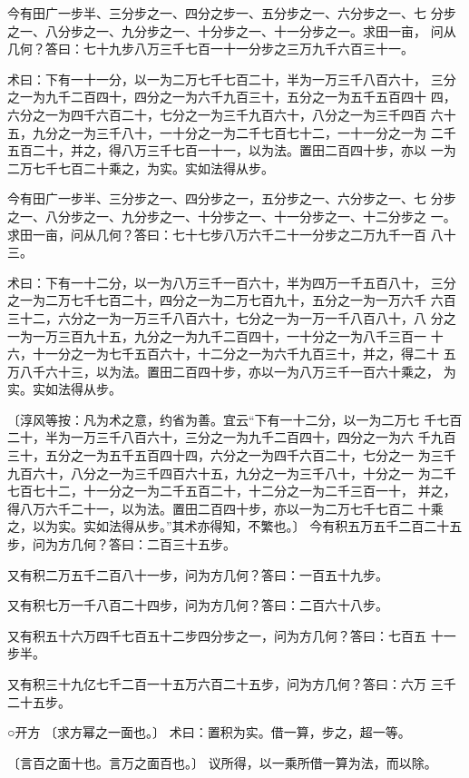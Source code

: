 \documentclass[a4paper,12pt,UTF8,twoside]{ctexbook}
\begin{document}
今有田广一步半、三分步之一、四分之步一、五分步之一、六分步之一、七 分步之一、八分步之一、九分步之一、十分步之一、十一分步之一。求田一亩， 问从几何？答曰：七十九步八万三千七百一十一分步之三万九千六百三十一。

术曰：下有一十一分，以一为二万七千七百二十，半为一万三千八百六十， 三分之一为九千二百四十，四分之一为六千九百三十，五分之一为五千五百四十 四，六分之一为四千六百二十，七分之一为三千九百六十，八分之一为三千四百 六十五，九分之一为三千八十，一十分之一为二千七百七十二，一十一分之一为 二千五百二十，并之，得八万三千七百一十一，以为法。置田二百四十步，亦以 一为二万七千七百二十乘之，为实。实如法得从步。

今有田广一步半、三分步之一、四分步之一，五分步之一、六分步之一、七 分步之一、八分步之一、九分步之一、十分步之一、十一分步之一、十二分步之 一。求田一亩，问从几何？答曰：七十七步八万六千二十一分步之二万九千一百 八十三。

术曰：下有一十二分，以一为八万三千一百六十，半为四万一千五百八十， 三分之一为二万七千七百二十，四分之一为二万七百九十，五分之一为一万六千 六百三十二，六分之一为一万三千八百六十，七分之一为一万一千八百八十，八 分之一为一万三百九十五，九分之一为九千二百四十，一十分之一为八千三百一 十六，十一分之一为七千五百六十，十二分之一为六千九百三十，并之，得二十 五万八千六十三，以为法。置田二百四十步，亦以一为八万三千一百六十乘之， 为实。实如法得从步。

〔淳风等按：凡为术之意，约省为善。宜云“下有一十二分，以一为二万七 千七百二十，半为一万三千八百六十，三分之一为九千二百四十，四分之一为六 千九百三十，五分之一为五千五百四十四，六分之一为四千六百二十，七分之一 为三千九百六十，八分之一为三千四百六十五，九分之一为三千八十，十分之一 为二千七百七十二，十一分之一为二千五百二十，十二分之一为二千三百一十， 并之，得八万六千二十一，以为法。置田二百四十步，亦以一为二万七千七百二 十乘之，以为实。实如法得从步。”其术亦得知，不繁也。〕 今有积五万五千二百二十五步，问为方几何？答曰：二百三十五步。

又有积二万五千二百八十一步，问为方几何？答曰：一百五十九步。

又有积七万一千八百二十四步，问为方几何？答曰：二百六十八步。

又有积五十六万四千七百五十二步四分步之一，问为方几何？答曰：七百五 十一步半。

又有积三十九亿七千二百一十五万六百二十五步，问为方几何？答曰：六万 三千二十五步。

○开方 〔求方幂之一面也。〕 术曰：置积为实。借一算，步之，超一等。

〔言百之面十也。言万之面百也。〕 议所得，以一乘所借一算为法，而以除。
\end{document}
